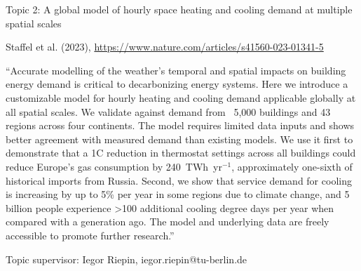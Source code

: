 \documentclass[10pt,aspectratio=169,dvipsnames]{beamer}
\begin{document}
\begin{frame}
  \begin{block}{Topic 2: A global model of hourly space heating and cooling demand at multiple spatial scales}
      
    Staffel et al. (2023), \href{https://www.nature.com/articles/s41560-023-01341-5}{https://www.nature.com/articles/s41560-023-01341-5}
    
    \enquote{Accurate modelling of the weather's temporal and spatial impacts on building energy demand is critical to decarbonizing energy systems. Here we introduce a customizable model for hourly heating and cooling demand applicable globally at all spatial scales. We validate against demand from ~5,000 buildings and 43 regions across four continents. The model requires limited data inputs and shows better agreement with measured demand than existing models. We use it first to demonstrate that a 1\degree\hspace{0pt}C reduction in thermostat settings across all buildings could reduce Europe's gas consumption by 240~TWh~yr$^{-1}$, approximately one-sixth of historical imports from Russia. Second, we show that service demand for cooling is increasing by up to 5\% per year in some regions due to climate change, and 5 billion people experience >100 additional cooling degree days per year when compared with a generation ago. The model and underlying data are freely accessible to promote further research.}

    \hfill
    Topic supervisor: Iegor Riepin, iegor.riepin@tu-berlin.de
    
  \end{block}
\end{frame}
\end{document}
